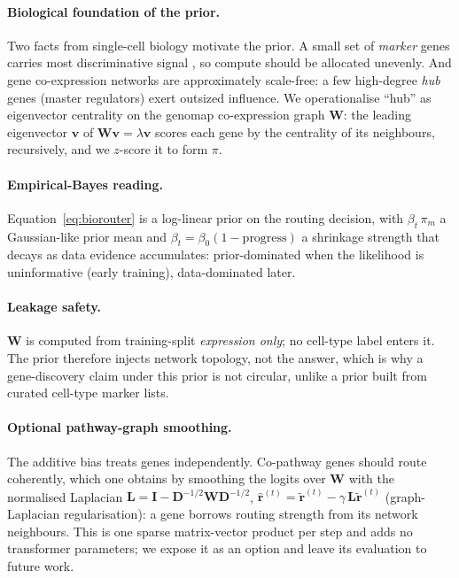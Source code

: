 \documentclass[letterpaper]{article}
\begin{document}
\paragraph{Biological foundation of the prior.}
Two facts from single-cell biology motivate the prior. A small set of \emph{marker}
genes carries most discriminative signal
\cite{ianevski2022fully,franzen2019panglaodb,hu2023cellmarker}, so compute should be
allocated unevenly. And gene co-expression networks are approximately scale-free: a few
high-degree \emph{hub} genes (master regulators) exert outsized influence. We
operationalise ``hub'' as eigenvector centrality on the genomap co-expression graph
$\mathbf{W}$: the leading eigenvector $\mathbf{v}$ of
$\mathbf{W}\mathbf{v}=\lambda\mathbf{v}$ scores each gene by the centrality of its
neighbours, recursively, and we $z$-score it to form $\pi$.

\paragraph{Empirical-Bayes reading.}
Equation~\eqref{eq:biorouter} is a log-linear prior on the routing decision, with
$\beta_t\,\pi_m$ a Gaussian-like prior mean and $\beta_t=\beta_0(1-\text{progress})$ a
shrinkage strength that decays as data evidence accumulates: prior-dominated when the
likelihood is uninformative (early training), data-dominated later.

\paragraph{Leakage safety.}
$\mathbf{W}$ is computed from training-split \emph{expression only}; no cell-type label
enters it. The prior therefore injects network topology, not the answer, which is why a
gene-discovery claim under this prior is not circular, unlike a prior built from curated
cell-type marker lists.

\paragraph{Optional pathway-graph smoothing.}
The additive bias treats genes independently. Co-pathway genes should route coherently,
which one obtains by smoothing the logits over $\mathbf{W}$ with the normalised
Laplacian $\mathbf{L}=\mathbf{I}-\mathbf{D}^{-1/2}\mathbf{W}\mathbf{D}^{-1/2}$,
$\hat{\mathbf{r}}^{(t)}=\tilde{\mathbf{r}}^{(t)}-\gamma\,\mathbf{L}\tilde{\mathbf{r}}^{(t)}$
(graph-Laplacian regularisation): a gene borrows routing strength from its network
neighbours. This is one sparse matrix-vector product per step and adds no transformer
parameters; we expose it as an option and leave its evaluation to future work.
\end{document}
